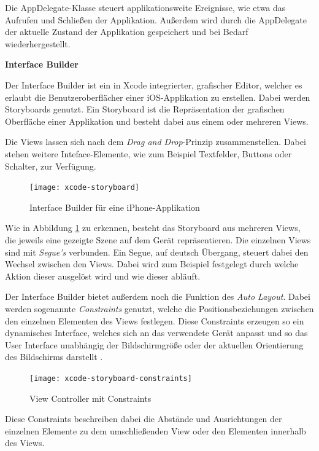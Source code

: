 Die AppDelegate-Klasse steuert applikationsweite Ereignisse, wie etwa das Aufrufen und Schließen der Applikation. Außerdem wird durch die AppDelegate der aktuelle Zustand der Applikation gespeichert und bei Bedarf wiederhergestellt.


\textbf{Interface Builder}

Der Interface Builder ist ein in Xcode integrierter, grafischer Editor, welcher es erlaubt die Benutzeroberflächer einer iOS-Applikation zu erstellen. Dabei werden Storyboards genutzt.
Ein Storyboard ist die Repräsentation der grafischen Oberfläche einer Applikation und besteht dabei aus einem oder mehreren Views.

Die Views lassen sich nach dem \emph{Drag and Drop}-Prinzip zusammenstellen. Dabei stehen weitere Inteface-Elemente, wie zum Beispiel Textfelder, Buttons oder Schalter, zur Verfügung.

\begin{figure}[htb!]
	\centering
	\texttt{[image: xcode-storyboard]}
	\caption{Interface Builder für eine iPhone-Applikation}
	\label{xcode-interface-builder}
\end{figure}

Wie in Abbildung \ref{xcode-interface-builder} zu erkennen, besteht das Storyboard aus mehreren Views, die jeweils eine gezeigte Szene auf dem Gerät repräsentieren. Die einzelnen Views sind mit \emph{Segue's} verbunden. Ein Segue, auf deutsch Übergang, steuert dabei den Wechsel zwischen den Views. Dabei wird zum Beispiel festgelegt durch welche Aktion dieser ausgelöst wird und wie dieser abläuft.


Der Interface Builder bietet außerdem noch die Funktion des \emph{Auto Layout}. Dabei werden sogenannte \emph{Constraints} genutzt, welche die Positionsbeziehungen zwischen den einzelnen Elementen des Views festlegen. Diese Constraints erzeugen so ein dynamisches Interface, welches sich an das verwendete Gerät anpasst und so das User Interface unabhängig der Bildschirmgröße oder der aktuellen Orientierung des Bildschirms darstellt \cite{xcodeautolayout}.

\begin{figure}[htb!]
		\centering
	\texttt{[image: xcode-storyboard-constraints]}
	\caption{View Controller mit Constraints}
	\label{xcode-storyboard-constraints}
\end{figure}

Diese Constraints beschreiben dabei die Abstände und Ausrichtungen der einzelnen Elemente zu dem umschließenden View oder den Elementen innerhalb des Views.

